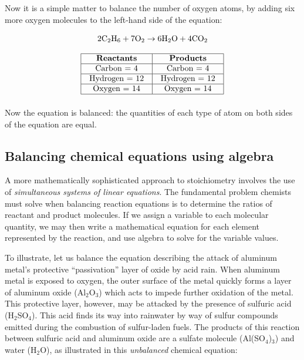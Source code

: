 \vskip 10pt

\filbreak

Now it is a simple matter to balance the number of oxygen atoms, by adding six more oxygen molecules to the left-hand side of the equation:

$$\hbox{2C}_2\hbox{H}_6 + \hbox{7O}_2 \to \hbox{6H}_2\hbox{O} + \hbox{4CO}_2$$


$$\vbox{\offinterlineskip
\halign{\strut
\vrule \quad\hfil # \ \hfil & 
\vrule \quad\hfil # \ \hfil \vrule \cr
\noalign{\hrule}
%
\textbf{Reactants} & \textbf{Products} \cr
%
\noalign{\hrule}
%
Carbon = 4 & Carbon = 4 \cr
%
\noalign{\hrule}
%
Hydrogen = 12 & Hydrogen = 12 \cr
%
\noalign{\hrule}
%
Oxygen = 14 & Oxygen = 14 \cr
%
\noalign{\hrule}
} %
}$$ %

Now the equation is balanced: the quantities of each type of atom on both sides of the equation are equal.  





\filbreak
\subsection{Balancing chemical equations using algebra}

A more mathematically sophisticated approach to stoichiometry involves the use of \textit{simultaneous systems of linear equations}.  The fundamental problem chemists must solve when balancing reaction equations is to determine the ratios of reactant and product molecules.  If we assign a variable to each molecular quantity, we may then write a mathematical equation for each element represented by the reaction, and use algebra to solve for the variable values.    

To illustrate, let us balance the equation describing the attack of aluminum metal's protective ``passivation'' layer of oxide by acid rain.  When aluminum metal is exposed to oxygen, the outer surface of the metal quickly forms a layer of aluminum oxide (Al$_{2}$O$_{3}$) which acts to impede further oxidation of the metal.  This protective layer, however, may be attacked by the presence of sulfuric acid (H$_{2}$SO$_{4}$).  This acid finds its way into rainwater by way of sulfur compounds emitted during the combustion of sulfur-laden fuels.  The products of this reaction between sulfuric acid and aluminum oxide are a sulfate molecule (Al(SO$_{4}$)$_{3}$) and water (H$_{2}$O), as illustrated in this \textit{unbalanced} chemical equation:  

